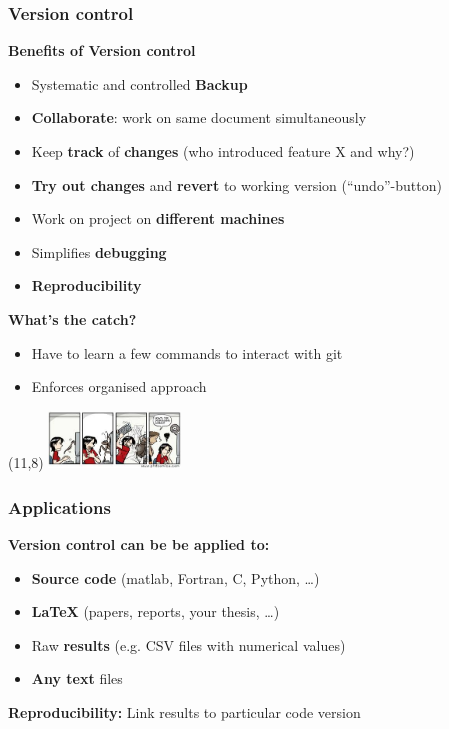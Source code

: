 \documentclass{beamer}
\begin{document}
\begin{frame}
  \frametitle{Version control}
  \textbf{\Large Benefits of Version control}
  \begin{itemize}
  \item Systematic and controlled \textbf{Backup}
  \item \textbf{Collaborate}: work on same document simultaneously
  \item Keep \textbf{track} of \textbf{changes} (who introduced feature X and why?)
  \item \textbf{Try out changes} and \textbf{revert} to working version (``undo''-button)
  \item Work on project on \textbf{different machines}
  \item Simplifies \textbf{debugging}
  \item \textbf{Reproducibility}
  \end{itemize}
  \vspace{2ex}
  \textbf{\Large What's the catch?}
  \begin{itemize}
    \item Have to learn a few commands to interact with git
    \item Enforces organised approach
  \end{itemize}
  \begin{textblock}{1.0}(11,8)
    \includegraphics[width=3.5cm]{bughunting.png}
  \end{textblock}
\end{frame}


\begin{frame}
  \frametitle{Applications}
  \textbf{\Large Version control can be be applied to:}
  \begin{itemize}
  \item \textbf{Source code} (matlab, Fortran, C, Python, \dots)
  \item \textbf{LaTeX} (papers, reports, your thesis, \dots)
  \item Raw \textbf{results} (e.g. CSV files with numerical values)
  \item \textbf{Any text} files\footnotemark
  \end{itemize}
  \vspace{4ex}
  \textbf{\Large Reproducibility:}
  Link results to particular code version
\end{frame}
\end{document}
